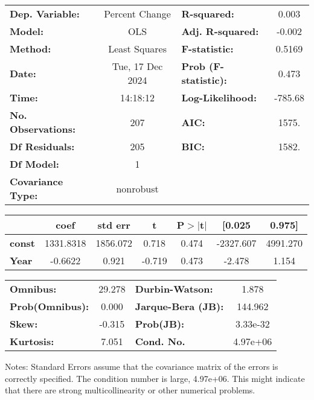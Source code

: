 \begin{center}
\begin{tabular}{lclc}
\toprule
\textbf{Dep. Variable:}    &  Percent Change  & \textbf{  R-squared:         } &     0.003   \\
\textbf{Model:}            &       OLS        & \textbf{  Adj. R-squared:    } &    -0.002   \\
\textbf{Method:}           &  Least Squares   & \textbf{  F-statistic:       } &    0.5169   \\
\textbf{Date:}             & Tue, 17 Dec 2024 & \textbf{  Prob (F-statistic):} &    0.473    \\
\textbf{Time:}             &     14:18:12     & \textbf{  Log-Likelihood:    } &   -785.68   \\
\textbf{No. Observations:} &         207      & \textbf{  AIC:               } &     1575.   \\
\textbf{Df Residuals:}     &         205      & \textbf{  BIC:               } &     1582.   \\
\textbf{Df Model:}         &           1      & \textbf{                     } &             \\
\textbf{Covariance Type:}  &    nonrobust     & \textbf{                     } &             \\
\bottomrule
\end{tabular}
\begin{tabular}{lcccccc}
               & \textbf{coef} & \textbf{std err} & \textbf{t} & \textbf{P$> |$t$|$} & \textbf{[0.025} & \textbf{0.975]}  \\
\midrule
\textbf{const} &    1331.8318  &     1856.072     &     0.718  &         0.474        &    -2327.607    &     4991.270     \\
\textbf{Year}  &      -0.6622  &        0.921     &    -0.719  &         0.473        &       -2.478    &        1.154     \\
\bottomrule
\end{tabular}
\begin{tabular}{lclc}
\textbf{Omnibus:}       & 29.278 & \textbf{  Durbin-Watson:     } &    1.878  \\
\textbf{Prob(Omnibus):} &  0.000 & \textbf{  Jarque-Bera (JB):  } &  144.962  \\
\textbf{Skew:}          & -0.315 & \textbf{  Prob(JB):          } & 3.33e-32  \\
\textbf{Kurtosis:}      &  7.051 & \textbf{  Cond. No.          } & 4.97e+06  \\
\bottomrule
\end{tabular}
\end{center}

Notes: \newline
 [1] Standard Errors assume that the covariance matrix of the errors is correctly specified. \newline
 [2] The condition number is large, 4.97e+06. This might indicate that there are \newline
 strong multicollinearity or other numerical problems.